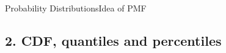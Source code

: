 \documentclass[8pt, usepdftitle = false]{beamer}
\begin{document}
\begin{frame}[allowframebreaks]{Probability Distributions}{Idea of PMF}
\begin{itemize}






\end{itemize}
\end{frame}



\subsection{2. CDF, quantiles and percentiles}
\frame{\subsectionpage}
\end{document}
